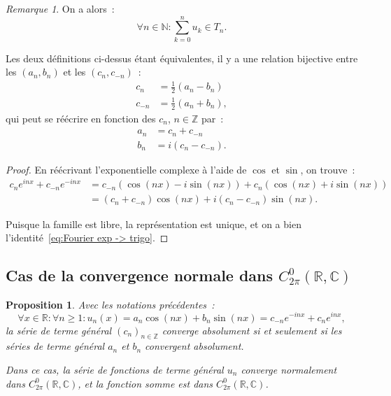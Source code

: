 \documentclass{report}
\newtheorem{prp}[thm]{Proposition}
\theoremstyle{definition}
\theoremstyle{remark}
\newtheorem*{rmq}{Remarque}
\numberwithin{equation}{section}
\newcommand{\C}{\mathbb C}
\newcommand{\R}{\mathbb R}
\newcommand{\Z}{\mathbb Z}
\newcommand{\N}{\mathbb N}
\begin{document}
			\begin{rmq} On a alors~:
			\begin{equation}
				\forall n \in \N : \sum_{k=0}^nu_k \in T_n.
			\end{equation}

			Les deux définitions ci-dessus étant équivalentes, il y a une relation bijective entre les $(a_n, b_n)$ et les $(c_n, c_{-n})$~:
			\begin{align}
				c_n &= \frac 12(a_n - b_n) \\
				c_{-n} &= \frac 12(a_n + b_n),
			\end{align}
			qui peut se réécrire en fonction des $c_n$, $n \in \Z$ par~:
			\begin{align}\label{eq:Fourier exp -> trigo}
				a_n &= c_n + c_{-n} \\
				b_n &= i(c_n - c_{-n}).
			\end{align}
			\end{rmq}

			\begin{proof} En réécrivant l'exponentielle complexe à l'aide de $\cos$ et $\sin$, on trouve~:
			\begin{align}
				c_ne^{inx} + c_{-n}e^{-inx} &= c_{-n}\left(\cos(nx) - i\sin(nx)\right) + c_n\left(\cos(nx) + i\sin(nx)\right) \\
					&= \left(c_n + c_{-n}\right)\cos(nx) + i\left(c_n - c_{-n}\right)\sin(nx).
			\end{align}

			Puisque la famille est libre, la représentation est unique, et on a bien l'identité~\eqref{eq:Fourier exp -> trigo}.
			\end{proof}

		\subsection{Cas de la convergence normale dans $C^0_{2\pi}(\R, \C)$}
			\begin{prp} Avec les notations précédentes~:
			\begin{equation}
				\forall x \in \R : \forall n \geq 1 : u_n(x) = a_n\cos(nx) + b_n\sin(nx) = c_{-n}e^{-inx} + c_ne^{inx},
			\end{equation}
			la série de terme général $(c_n)_{n \in \Z}$ converge absolument si et seulement si les séries de terme général $a_n$ et $b_n$ convergent
			absolument.

			Dans ce cas, la série de fonctions de terme général $u_n$ converge normalement dans $C^0_{2\pi}(\R, \C)$, et la fonction somme est dans
			$C^0_{2\pi}(\R, \C)$.
			\end{prp}
\end{document}
